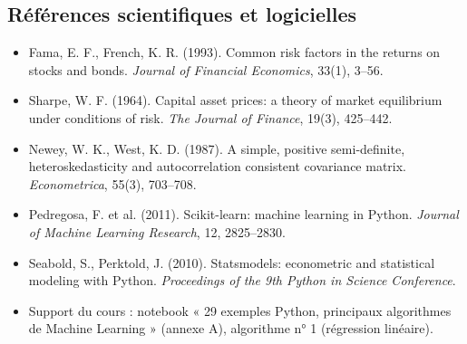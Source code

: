 \documentclass[12pt,a4paper]{article}
\begin{document}
\subsection*{Références scientifiques et logicielles}

\begin{itemize}[leftmargin=*, itemsep=0.5em]
    \item Fama, E. F., French, K. R. (1993). Common risk factors in the returns on stocks and bonds. \textit{Journal of Financial Economics}, 33(1), 3--56.

    \item Sharpe, W. F. (1964). Capital asset prices: a theory of market equilibrium under conditions of risk. \textit{The Journal of Finance}, 19(3), 425--442.

    \item Newey, W. K., West, K. D. (1987). A simple, positive semi-definite, heteroskedasticity and autocorrelation consistent covariance matrix. \textit{Econometrica}, 55(3), 703--708.

    \item Pedregosa, F. et al. (2011). Scikit-learn: machine learning in Python. \textit{Journal of Machine Learning Research}, 12, 2825--2830.

    \item Seabold, S., Perktold, J. (2010). Statsmodels: econometric and statistical modeling with Python. \textit{Proceedings of the 9th Python in Science Conference}.

    \item Support du cours : notebook « 29 exemples Python, principaux algorithmes de Machine Learning » (annexe A), algorithme n° 1 (régression linéaire).
\end{itemize}
\end{document}
